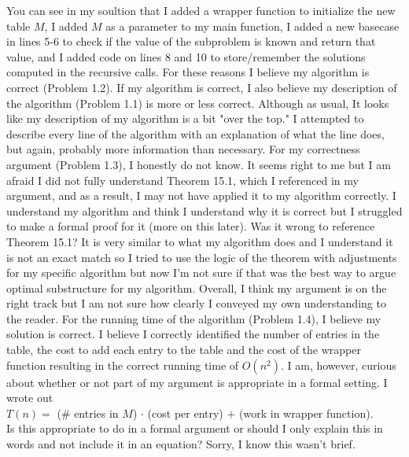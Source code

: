 \documentclass[11pt]{article}
\theoremstyle{nonumberplain}
\begin{document}
\begin{enumerate}
You can see in my soultion that I added a wrapper function to initialize the new table $M$, I added $M$ as a parameter to my main function, I added a new basecase in lines 5-6 to check if the value of the subproblem is known and return that value, and I added code on lines 8 and 10 to store/remember the solutions computed in the recursive calls. For these reasons I believe my algorithm is correct (Problem 1.2). If my algorithm is correct, I also believe my description of the algorithm (Problem 1.1) is more or less correct. Although as usual, It looks like my description of my algorithm is a bit "over the top." I attempted to describe every line of the algorithm with an explanation of what the line does, but again, probably more information than necessary. For my correctness argument (Problem 1.3), I honestly do not know. It seems right to me but I am afraid I did not fully understand Theorem 15.1, which I referenced in my argument, and as a result, I may not have applied it to my algorithm correctly. I understand my algorithm and think I understand why it is correct but I struggled to make a formal proof for it (more on this later). Was it wrong to reference Theorem 15.1? It is very similar to what my algorithm does and I understand it is not an exact match so I tried to use the logic of the theorem with adjustments for my specific algorithm but now I'm not sure if that was the best way to argue optimal substructure for my algorithm. Overall, I think my argument is on the right track but I am not sure how clearly I conveyed my own understanding to the reader. For the running time of the algorithm (Problem 1.4), I believe my solution is correct. I believe I correctly identified the number of entries in the table, the cost to add each entry to the table and the cost of the wrapper function resulting in the correct running time of $O(n^2)$. I am, however, curious about whether or not part of my argument is appropriate in a formal setting. I wrote out\\
$T(n)=$ (\# entries in $M$) $\cdot$ (cost per entry) $+$ (work in wrapper function).\\
Is this appropriate to do in a formal argument or should I only explain this in words and not include it in an equation? Sorry, I know this wasn't brief.

\end{enumerate}
\end{document}

